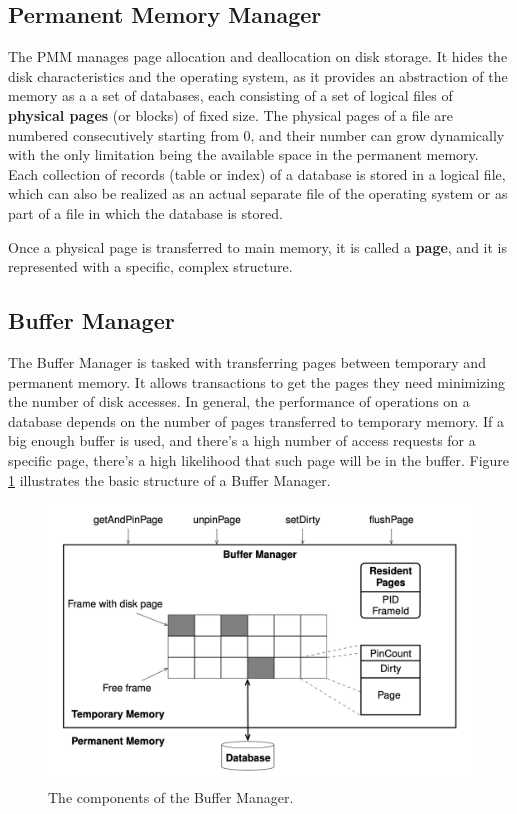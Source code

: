 \subsection{Permanent Memory Manager}

The PMM manages page allocation and deallocation on disk storage. It hides the disk characteristics and the operating system, as it provides an abstraction of the memory as a a set of databases, each consisting of a set of logical files of \textbf{physical pages} (or blocks) of fixed size. The physical pages of a file are numbered consecutively starting from 0, and their number can grow dynamically with the only limitation being the available space in the permanent memory. Each collection of records (table or index) of a database is stored in a logical file, which can also be realized as an actual separate file of the operating system or as part of a file in which the database is stored.

Once a physical page is transferred to main memory, it is called a \textbf{page}, and it is represented with a specific, complex structure.

\subsection{Buffer Manager}

The Buffer Manager is tasked with transferring pages between temporary and permanent memory. It allows transactions to get the pages they need minimizing the number of disk accesses. In general, the performance of operations on a database depends on the number of pages transferred to temporary memory. If a big enough buffer is used, and there's a high number of access requests for a specific page, there's a high likelihood that such page will be in the buffer. Figure \ref{fig:buffermanager} illustrates the basic structure of a Buffer Manager.

\begin{figure}[h]
    \centering
    \includegraphics[width=0.5\linewidth]{img/Buffer Manager.png}
    \caption{The components of the Buffer Manager.}
    \label{fig:buffermanager}
\end{figure}

